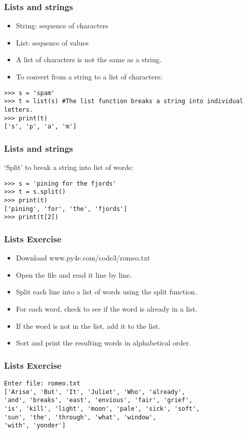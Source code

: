 \begin{frame}[fragile]\frametitle{Lists and strings}
  \begin{itemize}
  \item String: sequence of characters
  \item List: sequence of values
  \item A list of characters is not the same as a string. 
  \item To convert from a string to a list of characters:
  \end{itemize}
    \begin{lstlisting}
>>> s = 'spam'
>>> t = list(s) #The list function breaks a string into individual letters.
>>> print(t)
['s', 'p', 'a', 'm']
  \end{lstlisting}
\end{frame}

\begin{frame}[fragile]\frametitle{Lists and strings}
  `Split' to break a string into list of words:
     \begin{lstlisting}
>>> s = 'pining for the fjords'
>>> t = s.split()
>>> print(t)
['pining', 'for', 'the', 'fjords']
>>> print(t[2])
  \end{lstlisting}
\end{frame}



\begin{frame}[fragile]\frametitle{Lists Exercise}
  \begin{itemize}
  \item Download www.py4e.com/code3/romeo.txt
  \item Open the file and read it line by line. 
  \item Split each line into a list of words using the split function.
  \item For each word, check to see if the word is already in a list. 
  \item If the word is not in the list, add it to the list.
  \item Sort and print the resulting words in alphabetical order.
  \end{itemize}
\end{frame}

\begin{frame}[fragile]\frametitle{Lists Exercise}
  \begin{lstlisting}
Enter file: romeo.txt
['Arise', 'But', 'It', 'Juliet', 'Who', 'already',
'and', 'breaks', 'east', 'envious', 'fair', 'grief',
'is', 'kill', 'light', 'moon', 'pale', 'sick', 'soft',
'sun', 'the', 'through', 'what', 'window',
'with', 'yonder']
  \end{lstlisting}
\end{frame}


